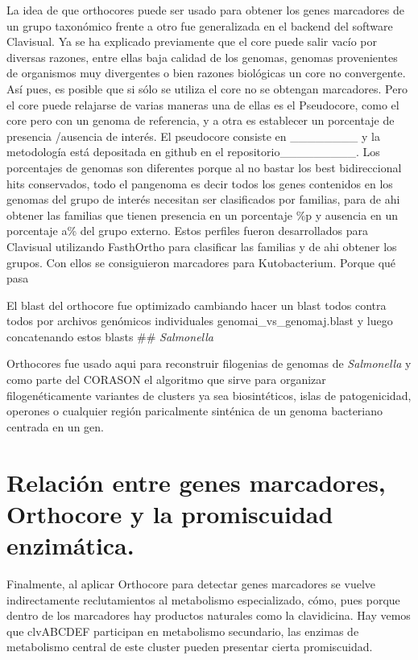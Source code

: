 \documentclass[12pt,twoside]{reedthesis}
\begin{document}
  La idea de que orthocores puede ser usado para obtener los genes
  marcadores de un grupo taxonómico frente a otro fue generalizada en el
  backend del software Clavisual. Ya se ha explicado previamente que el
  core puede salir vacío por diversas razones, entre ellas baja calidad de
  los genomas, genomas provenientes de organismos muy divergentes o bien
  razones biológicas un core no convergente. Así pues, es posible que si
  sólo se utiliza el core no se obtengan marcadores. Pero el core puede
  relajarse de varias maneras una de ellas es el Pseudocore, como el core
  pero con un genoma de referencia, y a otra es establecer un porcentaje
  de presencia /ausencia de interés. El pseudocore consiste en
  \_\_\_\_\_\_\_\_ y la metodología está depositada en github en el
  repositorio\_\_\_\_\_\_\_\_\_. Los porcentajes de genomas son diferentes
  porque al no bastar los best bidireccional hits conservados, todo el
  pangenoma es decir todos los genes contenidos en los genomas del grupo
  de interés necesitan ser clasificados por familias, para de ahi obtener
  las familias que tienen presencia en un porcentaje \%p y ausencia en un
  porcentaje a\% del grupo externo. Estos perfiles fueron desarrollados
  para Clavisual utilizando FasthOrtho para clasificar las familias y de
  ahi obtener los grupos. Con ellos se consiguieron marcadores para
  Kutobacterium. Porque qué pasa
  
  El blast del orthocore fue optimizado cambiando hacer un blast todos
  contra todos por archivos genómicos individuales
  genomai\_vs\_genomaj.blast y luego concatenando estos blasts \#\#
  \emph{Salmonella}
  
  Orthocores fue usado aqui para reconstruir filogenias de genomas de
  \emph{Salmonella} y como parte del CORASON el algoritmo que sirve para
  organizar filogenéticamente variantes de clusters ya sea biosintéticos,
  islas de patogenicidad, operones o cualquier región paricalmente
  sinténica de un genoma bacteriano centrada en un gen.
  
  \section{Relación entre genes marcadores, Orthocore y la promiscuidad
  enzimática.}\label{relacion-entre-genes-marcadores-orthocore-y-la-promiscuidad-enzimatica.}
  
  Finalmente, al aplicar Orthocore para detectar genes marcadores se
  vuelve indirectamente reclutamientos al metabolismo especializado, cómo,
  pues porque dentro de los marcadores hay productos naturales como la
  clavidicina. Hay vemos que clvABCDEF participan en metabolismo
  secundario, las enzimas de metabolismo central de este cluster pueden
  presentar cierta promiscuidad.
  
\end{document}
